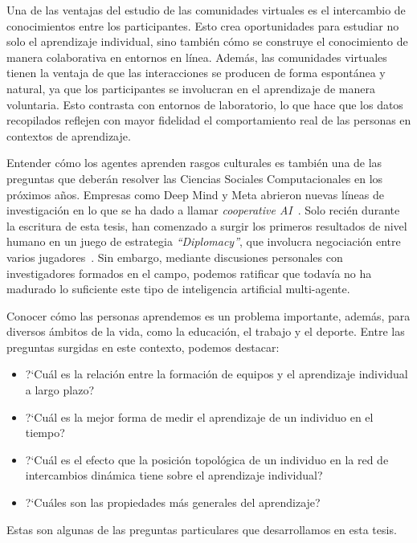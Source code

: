 \documentclass[a4paper,11pt]{book}
\theoremstyle{definition}
\begin{document}

Una de las ventajas del estudio de las comunidades virtuales es el intercambio de conocimientos entre los participantes.
%
Esto crea oportunidades para estudiar no solo el aprendizaje individual, sino tambi\'en c\'omo se construye el conocimiento de manera colaborativa en entornos en l\'inea.
%
Adem\'as, las comunidades virtuales tienen la ventaja de que las interacciones se producen de forma espont\'anea y natural, ya que los participantes se involucran en el aprendizaje de manera voluntaria.
%
Esto contrasta con entornos de laboratorio, lo que hace que los datos recopilados reflejen con mayor fidelidad el comportamiento real de las personas en contextos de aprendizaje.


Entender c\'omo los agentes aprenden rasgos culturales es tambi\'en una de las preguntas que deber\'an resolver las Ciencias Sociales Computacionales en los pr\'oximos a\~nos.
%
Empresas como Deep Mind y Meta abrieron nuevas l\'ineas de investigaci\'on en lo que se ha dado a llamar \emph{cooperative AI}~\cite{dafoe2020-coopAI,dafoe2021-coopAIcomment}.
%
Solo reci\'en durante la escritura de esta tesis, han comenzado a surgir los primeros resultados de nivel humano en un juego de estrategia \emph{``Diplomacy''}, que involucra negociaci\'on entre varios jugadores~\cite{kramar2022-deepMindDiplomacy,meta2022-diplomacy}.
%
Sin embargo, mediante discusiones personales con investigadores formados en el campo, podemos ratificar que todav\'ia no ha madurado lo suficiente este tipo de inteligencia artificial multi-agente.


Conocer c\'omo las personas aprendemos es un problema importante, adem\'as, para diversos \'ambitos de la vida, como la educaci\'on, el trabajo y el deporte.
Entre las preguntas surgidas en este contexto, podemos destacar:
\begin{itemize}
\item ?`Cu\'al es la relaci\'on entre la formaci\'on de equipos y el aprendizaje individual a largo plazo?

\item ?`Cu\'al es la mejor forma de medir el aprendizaje de un individuo en el tiempo?

\item ?`Cu\'al es el efecto que la posici\'on topol\'ogica de un individuo en la red de intercambios din\'amica tiene sobre el aprendizaje individual?

\item ?`Cu\'ales son las propiedades m\'as generales del aprendizaje?

\end{itemize}
Estas son algunas de las preguntas particulares que desarrollamos en esta tesis.
\end{document}

